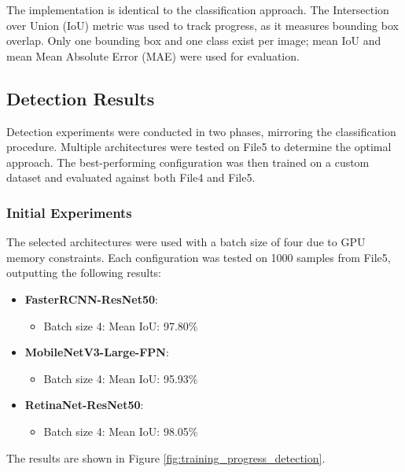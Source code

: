 \documentclass[conference]{IEEEtran}
\begin{document}
The implementation is identical to the classification approach. The Intersection over Union (IoU) metric was used to track progress, as
it measures bounding box overlap. Only one bounding box and one class exist per image; mean IoU and mean Mean Absolute Error (MAE) were
used for evaluation.

\subsection{Detection Results}

Detection experiments were conducted in two phases, mirroring the classification procedure. Multiple architectures were tested on File5
to determine the optimal approach. The best-performing configuration was then trained on a custom dataset and evaluated against both File4 and File5.

\subsubsection{Initial Experiments}

The selected architectures were used with a batch size of four due to GPU memory constraints. Each configuration was tested on 1000 samples
from File5, outputting the following results:

\begin{itemize}
  \item \textbf{FasterRCNN-ResNet50}:
    \begin{itemize}
        \item Batch size 4: Mean IoU: 97.80\%
    \end{itemize}
    
  \item \textbf{MobileNetV3-Large-FPN}:
    \begin{itemize}
        \item Batch size 4: Mean IoU: 95.93\% 
    \end{itemize}

  \item \textbf{RetinaNet-ResNet50}:
    \begin{itemize}
        \item Batch size 4: Mean IoU: 98.05\%
    \end{itemize}
\end{itemize}

The results are shown in Figure \ref{fig:training_progress_detection}.
\end{document}
